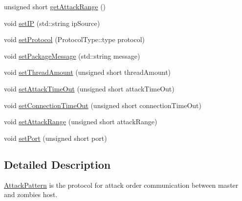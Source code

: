 \begin{DoxyCompactItemize}
unsigned short \mbox{\hyperlink{classAttackPattern_adcc7cb0abec4c18c22036123aba0458f}{get\+Attack\+Range}} ()
\item 
void \mbox{\hyperlink{classAttackPattern_a46fff75a90f6e2304ab91885bf57c1f1}{set\+IP}} (std\+::string ip\+Source)
\item 
void \mbox{\hyperlink{classAttackPattern_a8e774193bb78ade48cade75d2ef1e7f2}{set\+Protocol}} (Protocol\+Type\+::type protocol)
\item 
void \mbox{\hyperlink{classAttackPattern_a34ff445145be8ef914fa4f30025b11cb}{set\+Package\+Message}} (std\+::string message)
\item 
void \mbox{\hyperlink{classAttackPattern_a94b44f6b6dbc0f7af85a400dfb973509}{set\+Thread\+Amount}} (unsigned short thread\+Amount)
\item 
void \mbox{\hyperlink{classAttackPattern_a3d00dd5e76516f44f55ea28464eab3f8}{set\+Attack\+Time\+Out}} (unsigned short attack\+Time\+Out)
\item 
void \mbox{\hyperlink{classAttackPattern_ad66776126cda5c62189f576985e96542}{set\+Connection\+Time\+Out}} (unsigned short connection\+Time\+Out)
\item 
void \mbox{\hyperlink{classAttackPattern_aee8d40c3f0159a8be0df27b5bb2e41dc}{set\+Attack\+Range}} (unsigned short attack\+Range)
\item 
void \mbox{\hyperlink{classAttackPattern_a5f1164d9f79b500d03e1e5ba10d02031}{set\+Port}} (unsigned short port)
\end{DoxyCompactItemize}


\subsection{Detailed Description}
\mbox{\hyperlink{classAttackPattern}{Attack\+Pattern}} is the protocol for attack order communication between master and zombies host. 

